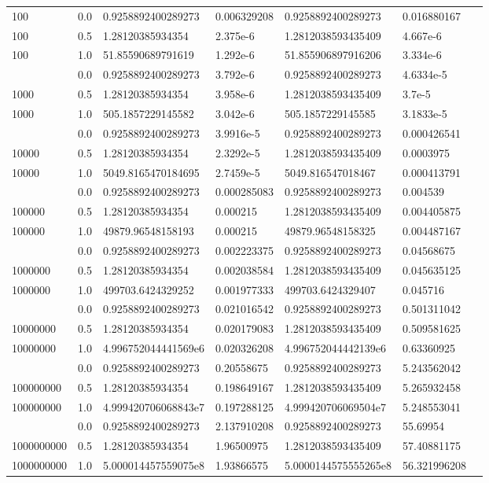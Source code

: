 \documentclass{article}
\begin{document}
\begin{landscape}
\begin{longtable}{@{}lllllll@{}}
    100 & 0.0 & 0.9258892400289273 & 0.006329208 & 0.9258892400289273 & 0.016880167 \\
    100 & 0.5 & 1.28120385934354 & 2.375e-6 & 1.2812038593435409 & 4.667e-6 \\
    100 & 1.0 & 51.85590689791619 & 1.292e-6 & 51.855906897916206 & 3.334e-6 \\
    \addlinespace
    1000 & 0.0 & 0.9258892400289273 & 3.792e-6 & 0.9258892400289273 & 4.6334e-5 \\
    1000 & 0.5 & 1.28120385934354 & 3.958e-6 & 1.2812038593435409 & 3.7e-5 \\
    1000 & 1.0 & 505.1857229145582 & 3.042e-6 & 505.1857229145585 & 3.1833e-5 \\
    \addlinespace
    10000 & 0.0 & 0.9258892400289273 & 3.9916e-5 & 0.9258892400289273 & 0.000426541 \\
    10000 & 0.5 & 1.28120385934354 & 2.3292e-5 & 1.2812038593435409 & 0.0003975 \\
    10000 & 1.0 & 5049.8165470184695 & 2.7459e-5 & 5049.816547018467 & 0.000413791 \\
    \addlinespace
    100000 & 0.0 & 0.9258892400289273 & 0.000285083 & 0.9258892400289273 & 0.004539 \\
    100000 & 0.5 & 1.28120385934354 & 0.000215 & 1.2812038593435409 & 0.004405875 \\
    100000 & 1.0 & 49879.96548158193 & 0.000215 & 49879.96548158325 & 0.004487167 \\
    \addlinespace
    1000000 & 0.0 & 0.9258892400289273 & 0.002223375 & 0.9258892400289273 & 0.04568675 \\
    1000000 & 0.5 & 1.28120385934354 & 0.002038584 & 1.2812038593435409 & 0.045635125 \\
    1000000 & 1.0 & 499703.6424329252 & 0.001977333 & 499703.6424329407 & 0.045716 \\
    \addlinespace
    10000000 & 0.0 & 0.9258892400289273 & 0.021016542 & 0.9258892400289273 & 0.501311042 \\
    10000000 & 0.5 & 1.28120385934354 & 0.020179083 & 1.2812038593435409 & 0.509581625 \\
    10000000 & 1.0 & 4.996752044441569e6 & 0.020326208 & 4.996752044442139e6 & 0.63360925 \\
    \addlinespace
    100000000 & 0.0 & 0.9258892400289273 & 0.20558675 & 0.9258892400289273 & 5.243562042 \\
    100000000 & 0.5 & 1.28120385934354 & 0.198649167 & 1.2812038593435409 & 5.265932458 \\
    100000000 & 1.0 & 4.999420706068843e7 & 0.197288125 & 4.999420706069504e7 & 5.248553041 \\
    \addlinespace
    1000000000 & 0.0 & 0.9258892400289273 & 2.137910208 & 0.9258892400289273 & 55.69954 \\
    1000000000 & 0.5 & 1.28120385934354 & 1.96500975 & 1.2812038593435409 & 57.40881175 \\
    1000000000 & 1.0 & 5.000014457559075e8 & 1.93866575 & 5.0000144575555265e8 & 56.321996208 \\
\end{longtable}
\end{landscape}
\end{document}
